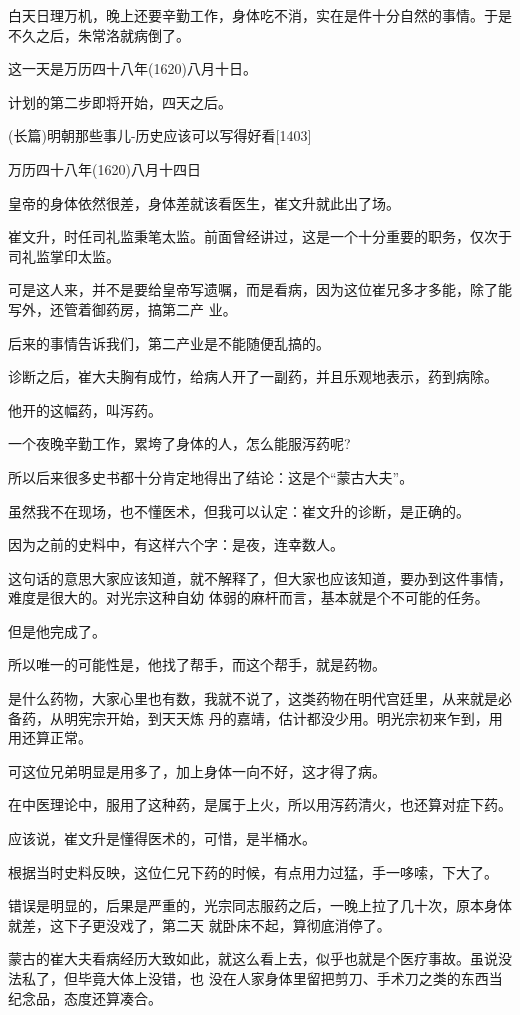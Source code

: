 \documentclass[11pt,a4paper,onecolumn]{article}
\begin{document}
白天日理万机，晚上还要辛勤工作，身体吃不消，实在是件十分自然的事情。于是不久之后，朱常洛就病倒了。

这一天是万历四十八年(1620)八月十日。

计划的第二步即将开始，四天之后。

(长篇)明朝那些事儿-历史应该可以写得好看$[$1403$]$

万历四十八年(1620)八月十四日

皇帝的身体依然很差，身体差就该看医生，崔文升就此出了场。

崔文升，时任司礼监秉笔太监。前面曾经讲过，这是一个十分重要的职务，仅次于司礼监掌印太监。

可是这人来，并不是要给皇帝写遗嘱，而是看病，因为这位崔兄多才多能，除了能写外，还管着御药房，搞第二产
业。

后来的事情告诉我们，第二产业是不能随便乱搞的。

诊断之后，崔大夫胸有成竹，给病人开了一副药，并且乐观地表示，药到病除。

他开的这幅药，叫泻药。

一个夜晚辛勤工作，累垮了身体的人，怎么能服泻药呢?

所以后来很多史书都十分肯定地得出了结论：这是个``蒙古大夫''。

虽然我不在现场，也不懂医术，但我可以认定：崔文升的诊断，是正确的。

因为之前的史料中，有这样六个字：是夜，连幸数人。

这句话的意思大家应该知道，就不解释了，但大家也应该知道，要办到这件事情，难度是很大的。对光宗这种自幼
体弱的麻杆而言，基本就是个不可能的任务。

但是他完成了。

所以唯一的可能性是，他找了帮手，而这个帮手，就是药物。

是什么药物，大家心里也有数，我就不说了，这类药物在明代宫廷里，从来就是必备药，从明宪宗开始，到天天炼
丹的嘉靖，估计都没少用。明光宗初来乍到，用用还算正常。

可这位兄弟明显是用多了，加上身体一向不好，这才得了病。

在中医理论中，服用了这种药，是属于上火，所以用泻药清火，也还算对症下药。

应该说，崔文升是懂得医术的，可惜，是半桶水。

根据当时史料反映，这位仁兄下药的时候，有点用力过猛，手一哆嗦，下大了。

错误是明显的，后果是严重的，光宗同志服药之后，一晚上拉了几十次，原本身体就差，这下子更没戏了，第二天
就卧床不起，算彻底消停了。

蒙古的崔大夫看病经历大致如此，就这么看上去，似乎也就是个医疗事故。虽说没法私了，但毕竟大体上没错，也
没在人家身体里留把剪刀、手术刀之类的东西当纪念品，态度还算凑合。
\end{document}
